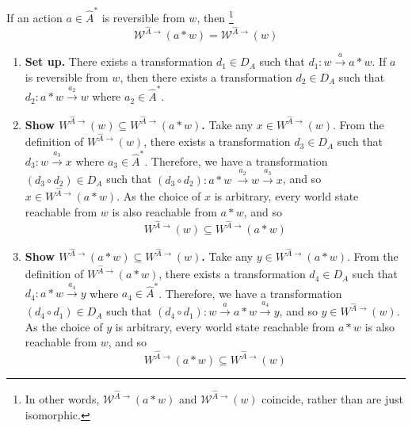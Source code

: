\begin{propositionE}
\label{prp:reachable_subworld_reversible_action}
    If an action $a \in \hat{A}^{*}$ is reversible from $w$, then    \footnote{
    In other words, $\mathscr{W}^{\hat{A}\to}(a \ast w)$ and $\mathscr{W}^{\hat{A}\to}(w)$ coincide, rather than are just isomorphic.
    }
    \begin{equation}
        \mathscr{W}^{\hat{A}\to}(a \ast w) = \mathscr{W}^{\hat{A}\to}(w)
    \end{equation}
\end{propositionE}
\begin{proofE}
\begin{enumerate}[(1)]
    \item \textbf{Set up.}
    There exists a transformation $d_{1} \in D_{A}$ such that $d_{1}: w \xrightarrow{a} a \ast w$.
    If $a$ is reversible from $w$, then there exists a transformation $d_{2} \in D_{A}$ such that $d_{2}: a \ast w \xrightarrow{a_{2}} w$ where $a_{2} \in \hat{A}^{*}$.
    
    \item \textbf{Show $W^{\hat{A}\to}(w) \subseteq W^{\hat{A}\to}(a \ast w)$.}
    Take any $x \in W^{\hat{A}\to}(w)$.
    From the definition of $W^{\hat{A}\to}(w)$, there exists a transformation $d_{3} \in D_{A}$ such that $d_{3}: w \xrightarrow{a_{3}} x$ where $a_{3} \in \hat{A}^{*}$.
    Therefore, we have a transformation $(d_{3} \circ d_{2}) \in D_{A}$ such that $(d_{3} \circ d_{2}): a \ast w \ \xrightarrow{a_{2}} w \xrightarrow{a_{3}} x$, and so $x \in W^{\hat{A}\to}(a \ast w)$.
    As the choice of $x$ is arbitrary, every world state reachable from $w$ is also reachable from $a \ast w$, and so
    \begin{equation}
        W^{\hat{A}\to}(w) \subseteq W^{\hat{A}\to}(a \ast w)
        \label{eqn:reachable_subworld_w_subset_reachable_subworld_result_reversible}
    \end{equation}

    \item \textbf{Show $W^{\hat{A}\to}(a \ast w) \subseteq W^{\hat{A}\to}(w)$.}
    Take any $y \in W^{\hat{A}\to}(a \ast w)$.
    From the definition of $W^{\hat{A}\to}(a \ast w)$, there exists a transformation $d_{4} \in D_{A}$ such that $d_{4}: a \ast w \xrightarrow{a_{4}} y$ where $a_{4} \in \hat{A}^{*}$.
    Therefore, we have a transformation $(d_{4} \circ d_{1}) \in D_{A}$ such that $(d_{4} \circ d_{1}): w \xrightarrow{a} a \ast w \xrightarrow{a_{4}} y$, and so $y \in W^{\hat{A}\to}(w)$.
    As the choice of $y$ is arbitrary, every world state reachable from $a \ast w$ is also reachable from $w$, and so
    \begin{equation}
        W^{\hat{A}\to}(a \ast w) \subseteq W^{\hat{A}\to}(w)
        \label{eqn:reachable_subworld_result_subset_reachable_subworld_w_reversible}
    \end{equation}


\end{enumerate}
\end{proofE}
